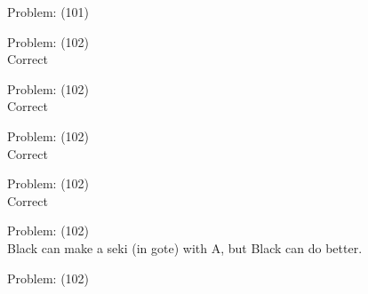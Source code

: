 \documentclass[11pt]{article}
\begin{document}
\begin{minipage}[t]{0.5\textwidth}
  {\centering
  
  Problem: (101)\\
  
  }
\end{minipage}
\begin{minipage}[t]{0.5\textwidth}
  {\centering
  
  Problem: (102)\\
  Correct\\
  }
\end{minipage}
\begin{minipage}[t]{0.5\textwidth}
  {\centering
  
  Problem: (102)\\
  Correct\\
  }
\end{minipage}
\begin{minipage}[t]{0.5\textwidth}
  {\centering
  
  Problem: (102)\\
  Correct\\
  }
\end{minipage}
\begin{minipage}[t]{0.5\textwidth}
  {\centering
  
  Problem: (102)\\
  Correct\\
  }
\end{minipage}
\begin{minipage}[t]{0.5\textwidth}
  {\centering
  
  Problem: (102)\\
  Black can make a seki (in gote) with A, but Black can do better.\\
  }
\end{minipage}
\begin{minipage}[t]{0.5\textwidth}
  {\centering
  
  Problem: (102)\\
  
  }
\end{minipage}
\end{document}

